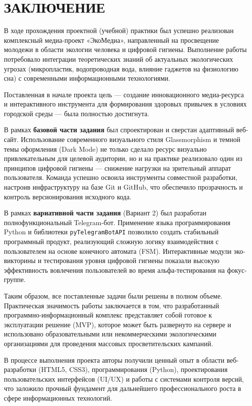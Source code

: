 \section*{ЗАКЛЮЧЕНИЕ}

В ходе прохождения проектной (учебной) практики был успешно реализован комплексный медиа-проект «ЭкоМедиа», направленный на просвещение молодежи в области экологии человека и цифровой гигиены. Выполнение работы потребовало интеграции теоретических знаний об актуальных экологических угрозах (микропластик, водопроводная вода, влияние гаджетов на физиологию сна) с современными информационными технологиями.

Поставленная в начале проекта цель — создание инновационного медиа-ресурса и интерактивного инструмента для формирования здоровых привычек в условиях городской среды — была полностью достигнута.

В рамках \textbf{базовой части задания} был спроектирован и сверстан адаптивный веб-сайт. Использование современного визуального стиля Glassmorphism и темной темы оформления (Dark Mode) не только сделало ресурс визуально привлекательным для целевой аудитории, но и на практике реализовало один из принципов цифровой гигиены — снижение нагрузки на зрительный аппарат пользователя. Команда успешно освоила инструменты совместной разработки, настроив инфраструктуру на базе Git и GitHub, что обеспечило прозрачность и контроль версионирования исходного кода.

В рамках \textbf{вариативной части задания} (Вариант 2) был разработан полнофункциональный Telegram-бот. Применение языка программирования Python и библиотеки \texttt{pyTelegramBotAPI} позволило создать стабильный программный продукт, реализующий сложную логику взаимодействия с пользователем на основе конечного автомата (FSM). Интерактивные модули эко-викторины и тестирования уровня цифровой гигиены показали высокую эффективность вовлечения пользователей во время альфа-тестирования на фокус-группе.

Таким образом, все поставленные задачи были решены в полном объеме. Практическая значимость работы заключается в том, что разработанный программно-информационный комплекс представляет собой готовое к эксплуатации решение (MVP), которое может быть развернуто на сервере и использовано образовательными или некоммерческими экологическими организациями для проведения массовых просветительских кампаний.

В процессе выполнения проекта авторы получили ценный опыт в области веб-разработки (HTML5, CSS3), программирования (Python), проектирования пользовательских интерфейсов (UI/UX) и работы с системами контроля версий, что заложило прочный фундамент для дальнейшего профессионального роста в сфере информационных технологий.
